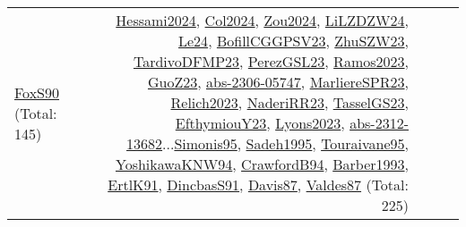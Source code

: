 {\begin{longtable}{p{3cm}r>{\raggedright\arraybackslash}p{6cm}>{\raggedright\arraybackslash}p{6cm}>{\raggedright\arraybackslash}p{8cm}}
\hyperref[detail:FoxS90]{FoxS90} (Total: 145) & \hyperref[detail:Hessami2024]{Hessami2024}, \hyperref[detail:Col2024]{Col2024}, \hyperref[detail:Zou2024]{Zou2024}, \hyperref[detail:LiLZDZW24]{LiLZDZW24}, \hyperref[detail:Le24]{Le24}, \hyperref[detail:BofillCGGPSV23]{BofillCGGPSV23}, \hyperref[detail:ZhuSZW23]{ZhuSZW23}, \hyperref[detail:TardivoDFMP23]{TardivoDFMP23}, \hyperref[detail:PerezGSL23]{PerezGSL23}, \hyperref[detail:Ramos2023]{Ramos2023}, \hyperref[detail:GuoZ23]{GuoZ23}, \hyperref[detail:abs-2306-05747]{abs-2306-05747}, \hyperref[detail:MarliereSPR23]{MarliereSPR23}, \hyperref[detail:Relich2023]{Relich2023}, \hyperref[detail:NaderiRR23]{NaderiRR23}, \hyperref[detail:TasselGS23]{TasselGS23}, \hyperref[detail:EfthymiouY23]{EfthymiouY23}, \hyperref[detail:Lyons2023]{Lyons2023}, \hyperref[detail:abs-2312-13682]{abs-2312-13682}...\hyperref[detail:Simonis95]{Simonis95}, \hyperref[detail:Sadeh1995]{Sadeh1995}, \hyperref[detail:Touraivane95]{Touraivane95}, \hyperref[detail:YoshikawaKNW94]{YoshikawaKNW94}, \hyperref[detail:CrawfordB94]{CrawfordB94}, \hyperref[detail:Barber1993]{Barber1993}, \hyperref[detail:ErtlK91]{ErtlK91}, \hyperref[detail:DincbasS91]{DincbasS91}, \hyperref[detail:Davis87]{Davis87}, \hyperref[detail:Valdes87]{Valdes87} (Total: 225)\\
\end{longtable}
}

\clearpage
